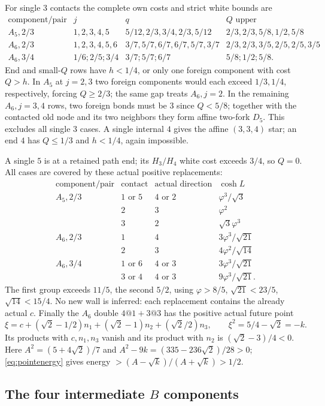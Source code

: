 \documentclass[11pt]{article}
\theoremstyle{definition}
\theoremstyle{remark}
\newcommand{\ph}{\varphi}
\begin{document}
For single $3$ contacts the complete own costs and strict white
bounds are
\[
\begin{array}{c|c|c|c}
\text{component/pair}&j&q&Q\text{ upper}\\ \hline
A_5,2/3&1,2,3,4,5&5/12,2/3,3/4,2/3,5/12&2/3,2/3,5/8,1/2,5/8\\
A_6,2/3&1,2,3,4,5,6&3/7,5/7,6/7,6/7,5/7,3/7&2/3,2/3,3/5,2/5,2/5,3/5\\
A_6,3/4&1/6;2/5;3/4&3/7;5/7;6/7&5/8;1/2;5/8.
\end{array}
\]
End and small-$Q$ rows have $h<1/4$, or only one foreign
component with cost $Q>h$. In $A_5$ at $j=2,3$ two foreign
components would each exceed $1/3,1/4$, respectively, forcing
$Q\ge2/3$; the same gap treats $A_6,j=2$.
In the remaining $A_6,j=3,4$ rows, two foreign bonds must be $3$
since $Q<5/8$; together with the contacted old node and its two
neighbors they form affine two-fork $D_5$. This excludes all single
$3$ cases. A single internal $4$ gives the affine $(3,3,4)$ star;
an end $4$ has $Q\le1/3$ and $h<1/4$, again impossible.

A single $5$ is at a retained path end; its $H_3/H_4$ white cost
exceeds $3/4$, so $Q=0$. All cases are covered by these actual
positive replacements:
\[
\begin{array}{c|c|c|c}
\text{component/pair}&\text{contact}&\text{actual direction}&\cosh L\\ \hline
A_5,2/3&1\text{ or }5&4\text{ or }2&\ph^3/\sqrt3\\
&2&3&\ph^2\\
&3&2&\sqrt3\ph^3\\
A_6,2/3&1&4&3\ph^3/\sqrt{21}\\
&2&3&4\ph^2/\sqrt{14}\\
A_6,3/4&1\text{ or }6&4\text{ or }3&3\ph^3/\sqrt{21}\\
&3\text{ or }4&4\text{ or }3&9\ph^3/\sqrt{21}.
\end{array}
\]
The first group exceeds $11/5$, the second $5/2$, using
$\ph>8/5$, $\sqrt{21}<23/5$, $\sqrt{14}<15/4$.
No new wall is inferred: each replacement contains the already
actual $c$. Finally the $A_6$ double $4@1+3@3$ has the positive
actual future point
\[
 \xi=c+(\sqrt2-1/2)n_1+(\sqrt2-1)n_2+(\sqrt2/2)n_3,
 \qquad \xi^2=5/4-\sqrt2=-k.
\]
Its products with $c,n_1,n_3$ vanish and its product with $n_2$
is $(\sqrt2-3)/4<0$. Here $A^2=(5+4\sqrt2)/7$ and
$A^2-9k=(335-236\sqrt2)/28>0$; \eqref{eq:pointenergy} gives
energy $>(A-\sqrt k)/(A+\sqrt k)>1/2$.

\subsection[The four intermediate B components]{The four intermediate \texorpdfstring{$B$}{B} components}
\end{document}
